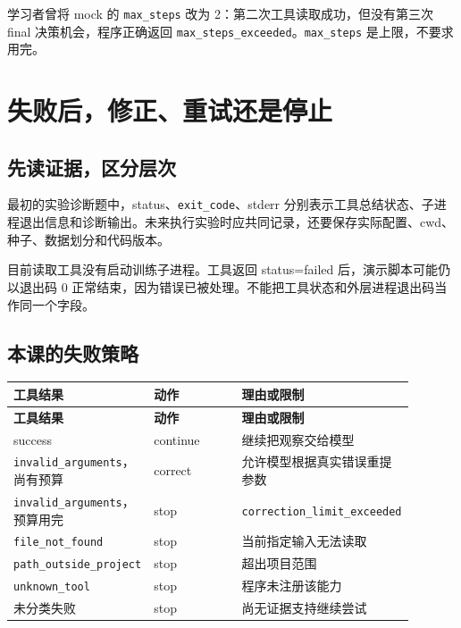 \documentclass[UTF8,zihao=-4,fontset=fandol]{ctexart}
\begin{document}
学习者曾将 mock 的 \nolinkurl{max_steps} 改为 2：第二次工具读取成功，但没有第三次 final 决策机会，程序正确返回 \nolinkurl{max_steps_exceeded}。\nolinkurl{max_steps} 是上限，不要求用完。

\section{失败后，修正、重试还是停止}

\subsection{先读证据，区分层次}

最初的实验诊断题中，status、\nolinkurl{exit_code}、stderr 分别表示工具总结状态、子进程退出信息和诊断输出。未来执行实验时应共同记录，还要保存实际配置、cwd、种子、数据划分和代码版本。

目前读取工具没有启动训练子进程。工具返回 status=failed 后，演示脚本可能仍以退出码 0 正常结束，因为错误已被处理。不能把工具状态和外层进程退出码当作同一个字段。

\subsection{本课的失败策略}

{\small\setlength{\tabcolsep}{4pt}
\renewcommand{\arraystretch}{1.25}
\begin{longtable}{>{\raggedright\arraybackslash}p{0.23\linewidth}>{\raggedright\arraybackslash}p{0.33\linewidth}>{\raggedright\arraybackslash}p{0.33\linewidth}}
\toprule
\textbf{工具结果} & \textbf{动作} & \textbf{理由或限制} \\
\midrule\endfirsthead
\toprule
\textbf{工具结果} & \textbf{动作} & \textbf{理由或限制} \\
\midrule\endhead
\bottomrule\endfoot
success & continue & 继续把观察交给模型 \\
\nolinkurl{invalid_arguments}，尚有预算 & correct & 允许模型根据真实错误重提参数 \\
\nolinkurl{invalid_arguments}，预算用完 & stop & \nolinkurl{correction_limit_exceeded} \\
\nolinkurl{file_not_found} & stop & 当前指定输入无法读取 \\
\nolinkurl{path_outside_project} & stop & 超出项目范围 \\
\nolinkurl{unknown_tool} & stop & 程序未注册该能力 \\
未分类失败 & stop & 尚无证据支持继续尝试 \\
\end{longtable}}
\end{document}
